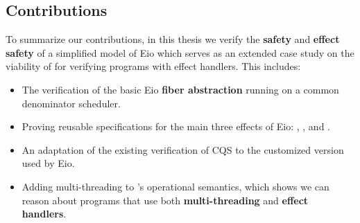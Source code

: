 \subsection{Contributions}
\label{sec:intro-contributions}

To summarize our contributions, in this thesis we verify the \textbf{safety} and \textbf{effect safety} of a simplified model of Eio which serves as an extended case study on the viability of \hazel{} for verifying programs with effect handlers.
This includes:

\begin{itemize}
  \item The verification of the basic Eio \textbf{fiber abstraction} running on a common denominator scheduler.
  \item Proving reusable specifications for the main three effects of Eio: \efork{}, \esuspend{}, and \egetctx{}.
  \item An adaptation of the existing verification of CQS to the customized version used by Eio.
  \item Adding multi-threading to \hazel{}'s operational semantics, which shows we can reason about programs that use both \textbf{multi-threading} and \textbf{effect handlers}.
\end{itemize}
